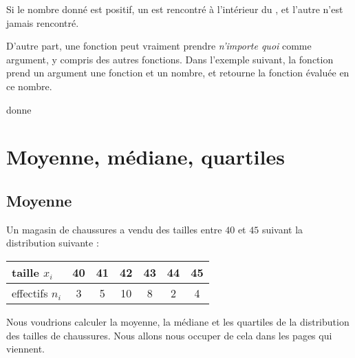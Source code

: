 Si le nombre donné est positif, un  est rencontré à l'intérieur du , et l'autre  n'est jamais rencontré.

D'autre part, une fonction peut vraiment prendre \emph{n'importe quoi} comme argument, y compris des autres fonctions. Dans l'exemple suivant, la fonction  prend un argument une fonction et un nombre, et retourne la fonction évaluée en ce nombre.



donne




\section{Moyenne, médiane, quartiles}
\label{SecZYftar}

\subsection{Moyenne}

\begin{example}     \label{ExerfDMnv}
    Un magasin de chaussures a vendu des tailles entre \( 40\) et \( 45\) suivant la distribution suivante :
    \begin{center}
        \begin{tabular}{|l||c|c|c|c|c|c|}
            \hline
            taille \( x_i\)&40&41&42&43&44&45\\
            \hline
            effectifs \( n_i\)&3&5&10&8&2&4\\
            \hline
        \end{tabular}
    \end{center}
    Nous voudrions calculer la moyenne, la médiane et les quartiles de la distribution des tailles de chaussures. Nous allons nous occuper de cela dans les pages qui viennent.
\end{example}
    
